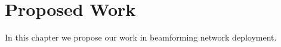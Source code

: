 \chapter{Proposed Work} \label{ch:futurework}

In this chapter we propose our work in beamforming
network deployment.

